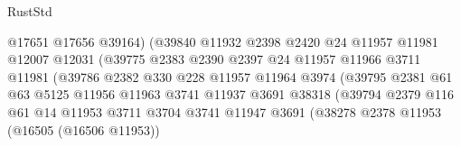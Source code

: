 \begin{lexlean}{RustStd}
\begin{coremodule}
                                      @17651
                                      @17656
                                      @39164)
                                    (@39840
                                      @11932
                                      @2398
                                      @2420
                                      @24
                                      @11957
                                      @11981
                                      @12007
                                      @12031
                                      (@39775
                                        @2383
                                        @2390
                                        @2397
                                        @24
                                        @11957
                                        @11966
                                        @3711
                                        @11981
                                        (@39786
                                          @2382
                                          @330
                                          @228
                                          @11957
                                          @11964
                                          @3974
                                          (@39795
                                            @2381
                                            @61
                                            @63
                                            @5125
                                            @11956
                                            @11963
                                            @3741
                                            @11937
                                            @3691
                                            @38318
                                            (@39794
                                              @2379
                                              @116
                                              @61
                                              @14
                                              @11953
                                              @3711
                                              @3704
                                              @3741
                                              @11947
                                              @3691
                                              (@38278
                                                @2378
                                                @11953
                                                (@16505 (@16506 @11953))

\end{coremodule}
\end{lexlean}
